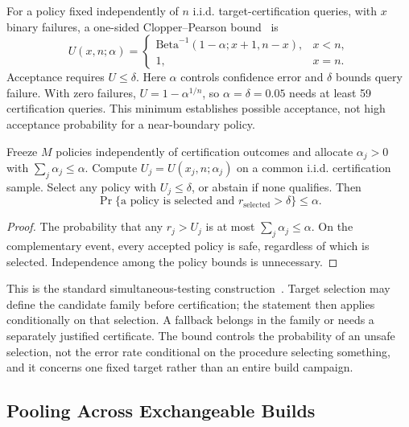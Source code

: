 For a policy fixed independently of $n$ i.i.d. target-certification queries, with $x$ binary failures, a one-sided Clopper--Pearson bound~\cite{clopper1934confidence} is
\begin{equation}
 U(x,n;\alpha)=
 \begin{cases}
  \mathrm{Beta}^{-1}(1-\alpha;x+1,n-x),&x<n,\\
  1,&x=n.
 \end{cases}
 \label{eq:cp}
\end{equation}
Acceptance requires $U\le\delta$. Here $\alpha$ controls confidence error and $\delta$ bounds query failure. With zero failures, $U=1-\alpha^{1/n}$, so $\alpha=\delta=0.05$ needs at least 59 certification queries. This minimum establishes possible acceptance, not high acceptance probability for a near-boundary policy.

\begin{proposition}
\label{prop:simultaneous}
Freeze $M$ policies independently of certification outcomes and allocate $\alpha_j>0$ with $\sum_j\alpha_j\le\alpha$. Compute $U_j=U(x_j,n;\alpha_j)$ on a common i.i.d. certification sample. Select any policy with $U_j\le\delta$, or abstain if none qualifies. Then
\begin{equation}
 \Pr\{\text{a policy is selected and }r_{\mathrm{selected}}>\delta\}
 \le\alpha.
 \label{eq:simultaneous}
\end{equation}
\end{proposition}
\begin{proof}
The probability that any $r_j>U_j$ is at most $\sum_j\alpha_j\le\alpha$. On the complementary event, every accepted policy is safe, regardless of which is selected. Independence among the policy bounds is unnecessary.
\end{proof}

This is the standard simultaneous-testing construction~\cite{angelopoulos2021ltt}. Target selection may define the candidate family before certification; the statement then applies conditionally on that selection. A fallback belongs in the family or needs a separately justified certificate. The bound controls the probability of an unsafe selection, not the error rate conditional on the procedure selecting something, and it concerns one fixed target rather than an entire build campaign.

\subsection{Pooling Across Exchangeable Builds}
\label{sec:pooling-theory}

